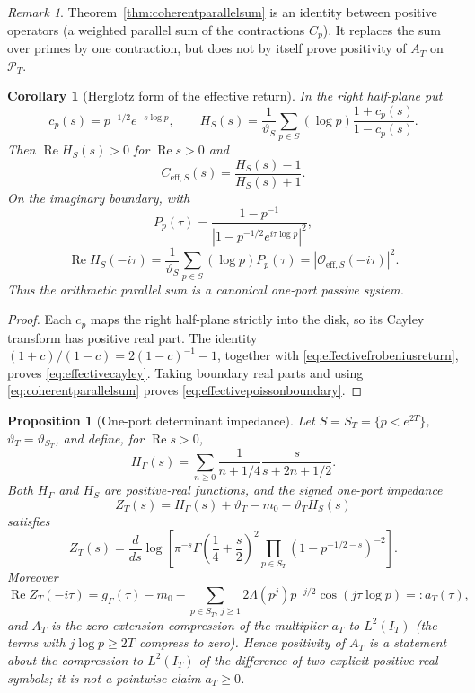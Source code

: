 \documentclass[11pt]{amsart}
\newtheorem{proposition}[theorem]{Proposition}
\newtheorem{corollary}[theorem]{Corollary}
\theoremstyle{definition}
\theoremstyle{remark}
\newtheorem{remark}[theorem]{Remark}
\begin{document}
\begin{remark}
Theorem~\ref{thm:coherentparallelsum} is an identity between positive
operators (a weighted parallel sum of the contractions \(C_p\)).  It replaces
the sum over primes by one contraction, but does not by itself prove
positivity of \(A_T\) on \(\mathcal P_T\).
\end{remark}

\begin{corollary}[Herglotz form of the effective return]
\label{cor:effectiveherglotz}
In the right half-plane put
\[
 c_p(s)=p^{-1/2}e^{-s\log p},\qquad
 H_S(s)=\frac1{\vartheta_S}\sum_{p\in S}(\log p)
             \frac{1+c_p(s)}{1-c_p(s)}.
\]
Then $\operatorname{Re}H_S(s)>0$ for $\operatorname{Re}s>0$ and
\begin{equation}\label{eq:effectivecayley}
 C_{\mathrm{eff},S}(s)=\frac{H_S(s)-1}{H_S(s)+1}.
\end{equation}
On the imaginary boundary, with
\[
 P_p(\tau)=\frac{1-p^{-1}}{|1-p^{-1/2}e^{i\tau\log p}|^2},
\]
\begin{equation}\label{eq:effectivepoissonboundary}
 \operatorname{Re}H_S(-i\tau)
 =\frac1{\vartheta_S}\sum_{p\in S}(\log p)P_p(\tau)
 =|\mathcal O_{\mathrm{eff},S}(-i\tau)|^2.
\end{equation}
Thus the arithmetic parallel sum is a canonical one-port passive system.
\end{corollary}

\begin{proof}
Each $c_p$ maps the right half-plane strictly into the disk, so its Cayley
transform has positive real part.  The identity
\(
 (1+c)/(1-c)=2(1-c)^{-1}-1
\), together with \eqref{eq:effectivefrobeniusreturn}, proves
\eqref{eq:effectivecayley}.  Taking boundary real parts and using
\eqref{eq:coherentparallelsum} proves
\eqref{eq:effectivepoissonboundary}.
\end{proof}

\begin{proposition}[One-port determinant impedance]
\label{prop:oneportdeterminant}
Let $S=S_T=\{p<e^{2T}\}$, $\vartheta_T=\vartheta_{S_T}$, and define, for $\operatorname{Re}s>0$,
\[
 H_\Gamma(s)=\sum_{n\ge0}\frac1{n+1/4}
                   \frac{s}{s+2n+1/2}.
\]
Both $H_\Gamma$ and $H_S$ are positive-real functions, and the signed
one-port impedance
\[
 Z_T(s)=H_\Gamma(s)+\vartheta_T-m_0-\vartheta_TH_S(s)
\]
satisfies
\begin{equation}\label{eq:oneportdeterminant}
 Z_T(s)=\frac{d}{ds}\log\!\left[
  \pi^{-s}\Gamma\!\left(\frac14+\frac s2\right)^2
  \prod_{p\in S_T}(1-p^{-1/2-s})^{-2}\right].
\end{equation}
Moreover
\[
 \operatorname{Re}Z_T(-i\tau)
 =g_\Gamma(\tau)-m_0-\sum_{p\in S_T,\,j\ge1}2\Lambda(p^j)p^{-j/2}
   \cos(j\tau\log p)=:a_T(\tau),
\]
and $A_T$ is the zero-extension compression of the multiplier $a_T$ to
$L^2(I_T)$ (the terms with $j\log p\ge2T$ compress to zero).  Hence positivity of
$A_T$ is a statement about the compression to $L^2(I_T)$ of the difference
of two explicit positive-real symbols; it is not a pointwise claim
$a_T\ge0$.
\end{proposition}
\end{document}
